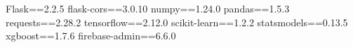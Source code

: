 Flask==2.2.5
flask-cors==3.0.10
numpy==1.24.0
pandas==1.5.3
requests==2.28.2
tensorflow==2.12.0
scikit-learn==1.2.2
statsmodels==0.13.5
xgboost==1.7.6
firebase-admin==6.6.0
